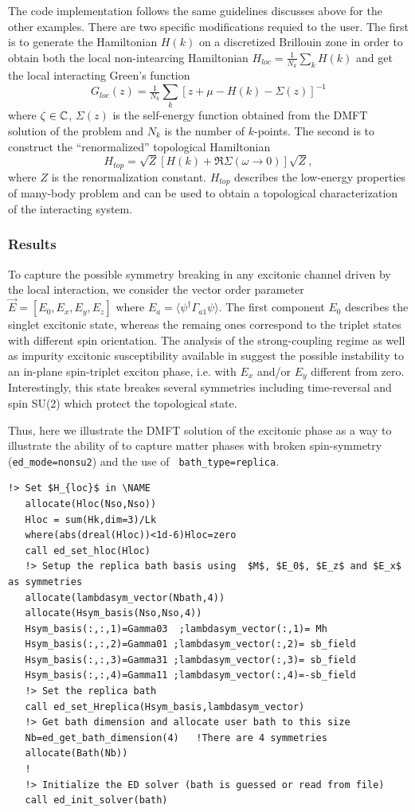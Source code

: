 \documentclass[edipack2.tex]{subfiles}
\begin{document}
The code implementation follows the same guidelines discusses above
for the other examples. There are two specific modifications requied
to the  user. The first is to generate the Hamiltonian $H(k)$ on a discretized Brillouin zone in
order to obtain both the local non-intearcing Hamiltonian
$H_{loc}=\tfrac{1}{N_k}\sum_k H(k)$ and get the local interacting
Green's function
$$
G_{loc}(z) = \tfrac{1}{N_k}\sum_k \left[z+\mu-H(k)-\Sigma(z) \right]^{-1}
$$
where $\zeta\in\mathbb{C}$, $\Sigma(z)$ is the self-energy function obtained from the DMFT
solution of the problem and $N_k$ is the number of $k$-points. 
The second is to  construct the ``renormalized'' topological
Hamiltonian
$$
H_{top} = \sqrt{Z}[H(k) + \Re\Sigma(\omega\to0)]\sqrt{Z}, 
$$
where $Z$ is the renormalization constant. $H_{top}$ describes the
low-energy properties of many-body problem and can be used to obtain a 
topological characterization of the interacting system.  





\subsubsection{Results}
To capture the possible symmetry breaking in any excitonic channel
driven by the local interaction, we consider the vector order
parameter
$\vec{E}=[E_0,E_x,E_y,E_z]$ where $E_a=\langle\psi^\dagger
\Gamma_{a1}\psi \rangle$.
The first component $E_0$ describes the singlet excitonic state,
whereas the remaing ones correspond to the triplet states with
different spin orientation.   
The analysis of the strong-coupling regime as well as impurity
excitonic susceptibility available in \NAME suggest the possible
instability to an in-plane spin-triplet exciton phase, i.e. with $E_x$
and/or $E_y$ different from zero.
Interestingly, this state breakes several symmetries including
time-reversal and spin SU(2) which protect the topological state.

Thus, here we illustrate the DMFT solution of the excitonic phase as a way to
illustrate the ability of \NAME to capture matter phases with broken
spin-symmetry ({\tt ed\_mode=nonsu2}) and the use of {\tt
  bath\_type=replica}.
\begin{lstlisting}[style=fstyle,numbers=none,basicstyle={\scriptsize\ttfamily}]
   !> Set $H_{loc}$ in \NAME
   allocate(Hloc(Nso,Nso))
   Hloc = sum(Hk,dim=3)/Lk
   where(abs(dreal(Hloc))<1d-6)Hloc=zero
   call ed_set_hloc(Hloc)
   !> Setup the replica bath basis using  $M$, $E_0$, $E_z$ and $E_x$ as symmetries
   allocate(lambdasym_vector(Nbath,4))
   allocate(Hsym_basis(Nso,Nso,4))
   Hsym_basis(:,:,1)=Gamma03  ;lambdasym_vector(:,1)= Mh
   Hsym_basis(:,:,2)=Gamma01 ;lambdasym_vector(:,2)= sb_field
   Hsym_basis(:,:,3)=Gamma31 ;lambdasym_vector(:,3)= sb_field
   Hsym_basis(:,:,4)=Gamma11 ;lambdasym_vector(:,4)=-sb_field
   !> Set the replica bath
   call ed_set_Hreplica(Hsym_basis,lambdasym_vector)
   !> Get bath dimension and allocate user bath to this size
   Nb=ed_get_bath_dimension(4)   !There are 4 symmetries
   allocate(Bath(Nb))
   !
   !> Initialize the ED solver (bath is guessed or read from file) 
   call ed_init_solver(bath)
\end{lstlisting}
\end{document}
